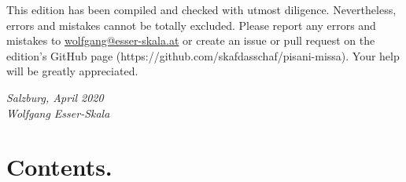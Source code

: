 \documentclass[parskip=full]{scrreprt}
\newif\iftemplate\templatetrue
\begin{document}
This edition has been compiled and checked with utmost diligence. Nevertheless, errors and mistakes cannot be totally excluded. Please report any errors and mistakes to \url{wolfgang@esser-skala.at} or create an issue or pull request on the edition’s GitHub page (https://github.com/skafdasschaf/pisani-missa). Your help will be greatly appreciated.

\bigskip
\textit{Salzburg, April 2020\\
Wolfgang Esser-Skala}


\chapter*{Contents.}

%

\cleardoublepage
\fi

\iftemplate

\fi
\end{document}
